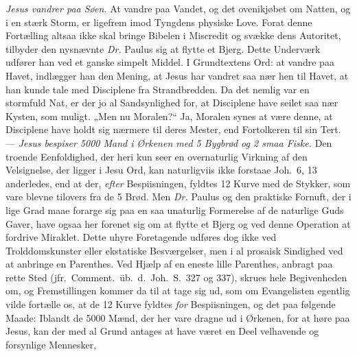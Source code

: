 \documentclass[12pt,a4paper]{book}
\begin{document}
\emph{Jesus vandrer paa Søen.} At vandre paa Vandet, og det ovenikjøbet om Natten, og i en
stærk Storm, er ligefrem imod Tyngdens physiske Love. Forat denne Fortælling altsaa ikke skal
bringe Bibelen i Miscredit og svække dens Autoritet, tilbyder den nysnævnte \textit{Dr.}
Paulus sig at flytte et Bjerg. Dette Underværk udfører han ved et ganske simpelt Middel. I
Grundtextens Ord: at
vandre paa Havet, indlægger han den Mening, at Jesus har vandret saa nær hen til Havet, at
han kunde tale med Disciplene fra Strandbredden. Da det nemlig var en stormfuld Nat, er der
jo al Sandsynlighed for, at Disciplene have seilet saa nær Kysten, som muligt. „Men nu
Moralen?“ Ja, Moralen synes at være denne, at Disciplene have holdt sig nærmere til deres
Mester, end Fortolkeren til sin Tert. --- \emph{Jesus bespiser 5000 Mand i Ørkenen med 5
Bygbrød og 2 smaa Fiske.} Den troende Eenfoldighed, der heri kun seer en overnaturlig
Virkning af den Velsignelse, der ligger i Jesu Ord, kan naturligviis ikke forstaae Joh.\ 6,
13 anderledes, end at der, \emph{efter} Bespiisningen, fyldtes 12 Kurve med de Stykker, som
vare blevne tilovers fra de 5 Brød. Men \textit{Dr.} Paulus og den praktiske Fornuft, der i
lige Grad maae forarge sig paa en saa unaturlig Formerelse af de naturlige Guds Gaver, have
ogsaa her forenet sig om at flytte et Bjerg og ved denne Operation at fordrive Miraklet.
Dette uhyre Foretagende udføres dog ikke ved Trolddomskunster eller ekstatiske Besværgelser,
men i al prosaisk Sindighed ved at anbringe en Parenthes. Ved Hjælp af en eneste lille
Parenthes, anbragt paa rette Sted (jfr.\ Comment.\ üb.\ d.\ Joh.\ S.\ 327 og 337), skrues
hele Begivenheden om, og Fremstillingen kommer da til at tage sig ud, som om Evangelisten
egentlig vilde fortælle os, at de 12 Kurve fyldtes \emph{for} Bespiisningen, og det paa
følgende Maade: Iblandt de 5000 Mænd, der her vare dragne ud i Ørkenen, for at høre paa
Jesus, kan der med al Grund antages at have været en Deel velhavende og forsynlige Mennesker,
\end{document}
